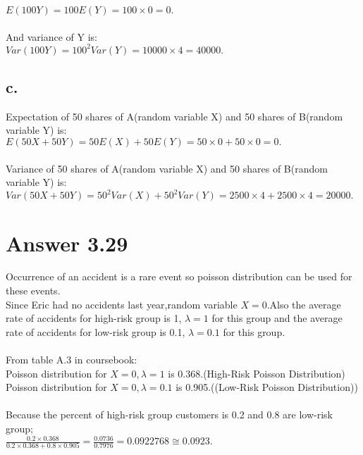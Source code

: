 \documentclass[12pt]{article}
\begin{document}
$E(100Y) = 100E(Y) = 100\times 0 = 0.$\\\\
And variance of Y is:\\

$Var(100Y) = 100^2Var(Y) = 10000\times 4 = 40000.$



\subsection*{c.}

Expectation of 50 shares of A(random variable X) and 50 shares of B(random variable Y) is:\\

$E(50X + 50Y) = 50E(X) + 50E(Y) = 50\times 0 + 50\times 0 = 0.$\\\\
Variance of 50 shares of A(random variable X) and 50 shares of B(random variable Y) is:\\

$Var(50X + 50Y) = 50^2Var(X) + 50^2Var(Y) = 2500\times 4 + 2500\times 4 = 20000.$


\section*{Answer 3.29}

Occurrence of an accident is a rare event so poisson distribution can be used for these events.\\
Since Eric had no accidents last year,random variable $X=0$.Also the average rate of accidents for high-risk group is 1, $\lambda = 1$ for this group and   the average rate of accidents for low-risk group is 0.1, $\lambda = 0.1$ for this group.\\\\
From table A.3 in coursebook:\\

Poisson distribution for $X=0,\lambda = 1$ is 0.368.(High-Risk Poisson Distribution)\\

Poisson distribution for $X=0,\lambda =0.1$ is 0.905.((Low-Risk Poisson Distribution))\\\\
Because the percent of high-risk group customers is 0.2 and 0.8 are low-risk group;\\
 

$\frac{0.2\times 0.368}{0.2 \times 0.368 + 0.8 \times 0.905} = \frac{0.0736}{0.7976} = 0.0922768 \cong 0.0923.$  
\end{document}
